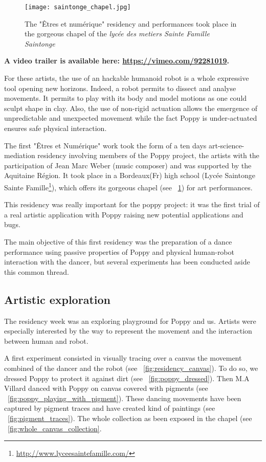 \begin{figure}[t]
    \begin{center}
        \texttt{[image: saintonge\_chapel.jpg]}
    \end{center}
    \caption{The "Êtres et numérique" residency and performances took place in the gorgeous chapel of the \emph{lycée des metiers Sainte Famille Saintonge}}
    \label{fig:saintonge_chapel}
\end{figure}

\textbf{A video trailer is available here: \url{https://vimeo.com/92281019}.}

For these artists, the use of an hackable humanoid robot is a whole expressive tool opening new horizons. Indeed, a robot permits to dissect and analyse movements. It permits to play with its body and model motions as one could sculpt shape in clay. Also, the use of non-rigid actuation allows the emergence of unpredictable and unexpected movement while the fact Poppy is under-actuated ensures safe physical interaction.


The first "Êtres et Numérique" work took the form of a ten days art-science-mediation residency involving members of the Poppy project, the artists with the participation of Jean Marc Weber (music composer) and was supported by the Aquitaine Région. It took place in a Bordeaux(Fr) high school (Lycée Saintonge Sainte Famille\footnote{\url{http://www.lyceesaintefamille.com/}}), which offers its gorgeous chapel (see \figurename~\ref{fig:saintonge_chapel}) for art performances.


This residency was really important for the poppy project: it was the first trial of a real artistic application with Poppy raising new potential applications and bugs.

The main objective of this first residency was the preparation of a dance performance using passive properties of Poppy and physical human-robot interaction with the dancer, but several experiments has been conducted aside this common thread.


\subsection{Artistic exploration} %

The residency week was an exploring playground for Poppy and us. Artists were especially interested by the way to represent the movement and the interaction between human and robot.

A first experiment consisted in visually tracing over a canvas the movement combined of the dancer and the robot (see \figurename~\ref{fig:residency_canvas}). To do so, we dressed Poppy to protect it against dirt (see \figurename~\ref{fig:poppy_dressed}). Then M.A Villard danced with Poppy on canvas covered with pigments (see \figurename~\ref{fig:poppy_playing_with_pigment}). These dancing movements have been captured by pigment traces and have created kind of paintings (see \figurename~\ref{fig:pigment_traces}). The whole collection as been exposed in the chapel (see \figurename~\ref{fig:whole_canvas_collection}.


